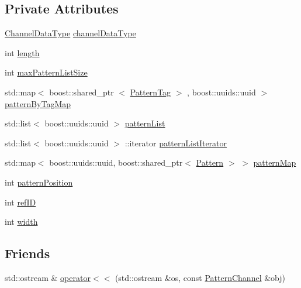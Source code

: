 \subsection*{\-Private \-Attributes}
\begin{DoxyCompactItemize}
\item 
\hyperlink{classcryomesh_1_1state_1_1PatternChannel_ac8a0ae515a221519890fc1181f2c895a}{\-Channel\-Data\-Type} \hyperlink{classcryomesh_1_1state_1_1PatternChannel_a0638a69625dd19480563b245dc1c6853}{channel\-Data\-Type}
\item 
int \hyperlink{classcryomesh_1_1state_1_1PatternChannel_a979af8e9743379cc8484cfa7348838f2}{length}
\item 
int \hyperlink{classcryomesh_1_1state_1_1PatternChannel_aeab8770881ec9be1b48c712a23dd6271}{max\-Pattern\-List\-Size}
\item 
std\-::map$<$ boost\-::shared\-\_\-ptr\*
$<$ \hyperlink{classcryomesh_1_1state_1_1PatternTag}{\-Pattern\-Tag} $>$\*
, boost\-::uuids\-::uuid $>$ \hyperlink{classcryomesh_1_1state_1_1PatternChannel_a5155045e7e94fc10a1d60e418bf82b71}{pattern\-By\-Tag\-Map}
\item 
std\-::list$<$ boost\-::uuids\-::uuid $>$ \hyperlink{classcryomesh_1_1state_1_1PatternChannel_a71800edd10923b7b00f0c292414b4ba1}{pattern\-List}
\item 
std\-::list$<$ boost\-::uuids\-::uuid $>$\*
\-::iterator \hyperlink{classcryomesh_1_1state_1_1PatternChannel_ac06b2bd5e0bc4aa4da633bc80a64b290}{pattern\-List\-Iterator}
\item 
std\-::map$<$ boost\-::uuids\-::uuid, \*
boost\-::shared\-\_\-ptr$<$ \hyperlink{classcryomesh_1_1state_1_1Pattern}{\-Pattern} $>$ $>$ \hyperlink{classcryomesh_1_1state_1_1PatternChannel_a72f70fbaad5ff134b07c3fe198d9fd67}{pattern\-Map}
\item 
int \hyperlink{classcryomesh_1_1state_1_1PatternChannel_af4a9ce80cd65ae8a11ec27e4b027a34c}{pattern\-Position}
\item 
int \hyperlink{classcryomesh_1_1state_1_1PatternChannel_a609d1d8ac76ff856bf7885c040dc339a}{ref\-I\-D}
\item 
int \hyperlink{classcryomesh_1_1state_1_1PatternChannel_af7bcede6cf5c8d768e7d1f1d897106d2}{width}
\end{DoxyCompactItemize}
\subsection*{\-Friends}
\begin{DoxyCompactItemize}
\item 
std\-::ostream \& \hyperlink{classcryomesh_1_1state_1_1PatternChannel_a8a4a6cb06dd05aa353207980bcf59319}{operator$<$$<$} (std\-::ostream \&os, const \hyperlink{classcryomesh_1_1state_1_1PatternChannel}{\-Pattern\-Channel} \&obj)
\end{DoxyCompactItemize}


